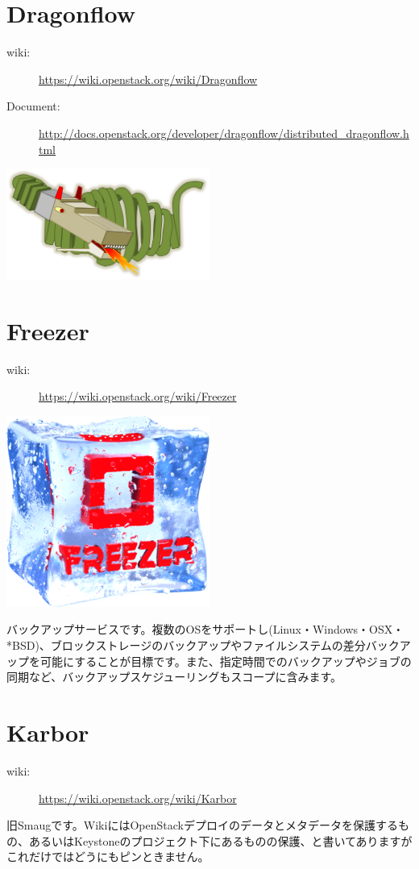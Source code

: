 \documentclass[10pt,b5paper,tombo,openany]{jsbook}
\begin{document}
\section{Dragonflow}
\begin{description}
	\item[wiki:] \url{https://wiki.openstack.org/wiki/Dragonflow}
	\item[Document:] \url{http://docs.openstack.org/developer/dragonflow/distributed_dragonflow.html}
\end{description}
\includegraphics[width=0.5\textwidth]{img/Df_logo.png}

\section{Freezer}
\begin{description}
	\item[wiki:] \url{https://wiki.openstack.org/wiki/Freezer}
\end{description}

\includegraphics[width=0.5\textwidth]{img/freezer_logo.png}

バックアップサービスです。複数のOSをサポートし(Linux・Windows・OSX・*BSD)、ブロックストレージのバックアップやファイルシステムの差分バックアップを可能にすることが目標です。また、指定時間でのバックアップやジョブの同期など、バックアップスケジューリングもスコープに含みます。

\section{Karbor}
\begin{description}
	\item[wiki:] \url{https://wiki.openstack.org/wiki/Karbor}
\end{description}
旧Smaugです。WikiにはOpenStackデプロイのデータとメタデータを保護するもの、あるいはKeystoneのプロジェクト下にあるものの保護、と書いてありますがこれだけではどうにもピンときません。
\end{document}
